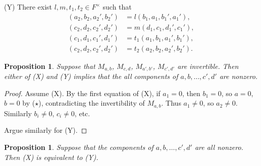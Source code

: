 \documentclass{article}
\newtheorem{prop}[thm]{Proposition}
\begin{document}
(Y) There exist $l,m,t_1,t_2\in F^{\times}$ such that
\begin{align*}
(a_2,b_2,a_2',b_2')&=l(b_1,a_1,b_1',a_1'), \\
(c_2,d_2,c_2',d_2')&=m(d_1,c_1,d_1',c_1'), \\
(c_1,d_1,c_1',d_1')&=t_1(a_1,b_1,a_1',b_1'), \\
(c_2,d_2,c_2',d_2')&=t_2(a_2,b_2,a_2',b_2'). 
\end{align*}

\begin{prop} Suppose that $M_{a,b}$, $M_{c,d}$, $M_{a',b'}$, $M_{c',d'}$ are invertible. Then
either of (X) and (Y) implies that the all components of $a,b,\dots,c',d'$ are  nonzero.
\end{prop}



\begin{proof}
Assume (X).
By the first equation of (X), if $a_1=0$, then $b_1=0$, so $a=0$, $b=0$ by ($\star$), contradicting the invertibility of  $M_{a,b}$. Thus $a_1\ne 0$, so $a_2\ne 0$.
Similarly $b_i\ne 0$, $c_i\ne 0$, etc.

Argue similarly for (Y).
\end{proof}

\begin{prop}
Suppose that the components of $a,b,\dots,c',d'$ are all nonzero.
Then (X) is equivalent to  (Y).
\end{prop}
\end{document}
